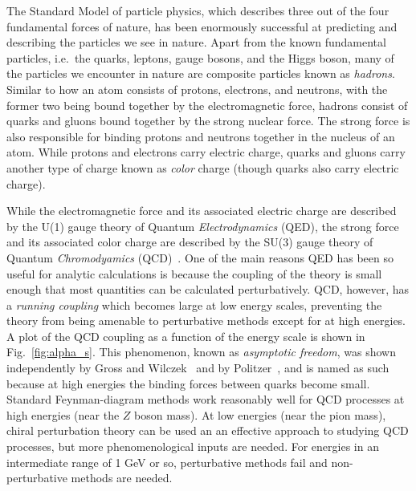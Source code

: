 The Standard Model of particle physics, which describes three out of the four fundamental forces of nature, has been enormously successful at predicting and describing the particles we see in nature. Apart from the known fundamental particles, i.e.\ the quarks, leptons, gauge bosons, and the Higgs boson, many of the particles we encounter in nature are composite particles known as \emph{hadrons}. Similar to how an atom consists of protons, electrons, and neutrons, with the former two being bound together by the electromagnetic force, hadrons consist of quarks and gluons bound together by the strong nuclear force. The strong force is also responsible for binding protons and neutrons together in the nucleus of an atom.  While protons and electrons carry electric charge, quarks and gluons carry another type of charge known as \emph{color} charge (though quarks also carry electric charge).

While the electromagnetic force and its associated electric charge are described by the U(1) gauge theory of Quantum \emph{Electrodynamics} (QED), the strong force and its associated color charge are described by the SU(3) gauge theory of Quantum \emph{Chromodyamics} (QCD)~\cite{Fritzsch:1973pi}. One of the main reasons QED has been so useful for analytic calculations is because the coupling of the theory is small enough that most quantities can be calculated perturbatively. QCD, however, has a \emph{running coupling} which becomes large at low energy scales, preventing the theory from being amenable to perturbative methods except for at high energies. A plot of the QCD coupling as a function of the energy scale is shown in Fig.~\ref{fig:alpha_s}. This phenomenon, known as \emph{asymptotic freedom}, was shown independently by Gross and Wilczek~\cite{Gross:1973id} and by Politzer~\cite{Politzer:1973fx}, and is named as such because at high energies the binding forces between quarks become small. Standard Feynman-diagram methods work reasonably well for QCD processes at high energies (near the $Z$ boson mass). At low energies (near the pion mass), chiral perturbation theory can be used an an effective approach to studying QCD processes, but more phenomenological inputs are needed.  For energies in an intermediate range of 1 GeV or so, perturbative methods fail and non-perturbative methods are needed.

